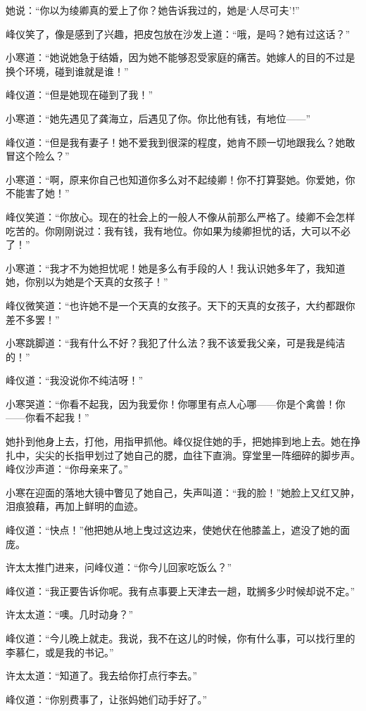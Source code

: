 \par 她说：“你以为绫卿真的爱上了你？她告诉我过的，她是‘人尽可夫’!”
\par 峰仪笑了，像是感到了兴趣，把皮包放在沙发上道：“哦，是吗？她有过这话？”
\par 小寒道：“她说她急于结婚，因为她不能够忍受家庭的痛苦。她嫁人的目的不过是换个环境，碰到谁就是谁！”
\par 峰仪道：“但是她现在碰到了我！”
\par 小寒道：“她先遇见了龚海立，后遇见了你。你比他有钱，有地位——”
\par 峰仪道：“但是我有妻子！她不爱我到很深的程度，她肯不顾一切地跟我么？她敢冒这个险么？”
\par 小寒道：“啊，原来你自己也知道你多么对不起绫卿！你不打算娶她。你爱她，你不能害了她！”
\par 峰仪笑道：“你放心。现在的社会上的一般人不像从前那么严格了。绫卿不会怎样吃苦的。你刚刚说过：我有钱，我有地位。你如果为绫卿担忧的话，大可以不必了！”
\par 小寒道：“我才不为她担忧呢！她是多么有手段的人！我认识她多年了，我知道她，你别以为她是个天真的女孩子！”
\par 峰仪微笑道：“也许她不是一个天真的女孩子。天下的天真的女孩子，大约都跟你差不多罢！”
\par 小寒跳脚道：“我有什么不好？我犯了什么法？我不该爱我父亲，可是我是纯洁的！”
\par 峰仪道：“我没说你不纯洁呀！”
\par 小寒哭道：“你看不起我，因为我爱你！你哪里有点人心哪——你是个禽兽！你——你看不起我！”
\par 她扑到他身上去，打他，用指甲抓他。峰仪捉住她的手，把她摔到地上去。她在挣扎中，尖尖的长指甲划过了她自己的腮，血往下直淌。穿堂里一阵细碎的脚步声。峰仪沙声道：“你母亲来了。”
\par 小寒在迎面的落地大镜中瞥见了她自己，失声叫道：“我的脸！”她脸上又红又肿，泪痕狼藉，再加上鲜明的血迹。
\par 峰仪道：“快点！”他把她从地上曳过这边来，使她伏在他膝盖上，遮没了她的面庞。
\par 许太太推门进来，问峰仪道：“你今儿回家吃饭么？”
\par 峰仪道：“我正要告诉你呢。我有点事要上天津去一趟，耽搁多少时候却说不定。”
\par 许太太道：“噢。几时动身？”
\par 峰仪道：“今儿晚上就走。我说，我不在这儿的时候，你有什么事，可以找行里的李慕仁，或是我的书记。”
\par 许太太道：“知道了。我去给你打点行李去。”
\par 峰仪道：“你别费事了，让张妈她们动手好了。”
